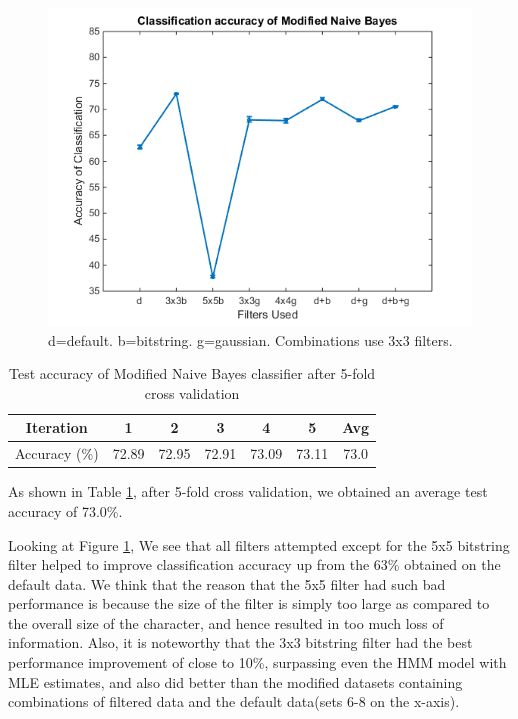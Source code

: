 \documentclass{article} %
\begin{document}
\begin{figure}[h]
\begin{center}
\includegraphics[scale=0.35]{nb_mod.png}
\end{center}
\caption{d=default. b=bitstring. g=gaussian. Combinations use 3x3 filters.}
\label{fig:filter-comb}
\end{figure}

\begin{table}[h]
\centering
\begin{tabular}{|c|c|c|c|c|c|c|}
\hline
Iteration & 1 & 2 & 3 & 4 & 5 & Avg \\
\hline 
Accuracy (\%) & 72.89 & 72.95 & 72.91 & 73.09 & 73.11 & 73.0 \\
\hline 
\end{tabular}
\caption{Test accuracy of Modified Naive Bayes classifier after 5-fold cross validation}
\label{tab:mod-nb-cross-val}
\end{table}

As shown in Table \ref{tab:mod-nb-cross-val}, after 5-fold cross validation, we obtained an average test accuracy of 73.0\%.

Looking at Figure \ref{fig:filter-comb}, We see that all filters attempted except for the 5x5 bitstring filter helped to improve classification accuracy up from the 63\% obtained on the default data. We think that the reason that the 5x5 filter had such bad performance is because the size of the filter is simply too large as compared to the overall size of the character, and hence resulted in too much loss of information. Also, it is noteworthy that the 3x3 bitstring filter had the best performance improvement of close to 10\%, surpassing even the HMM model with MLE estimates, and also did better than the modified datasets containing combinations of filtered data and the default data(sets 6-8 on the x-axis).
\end{document}
